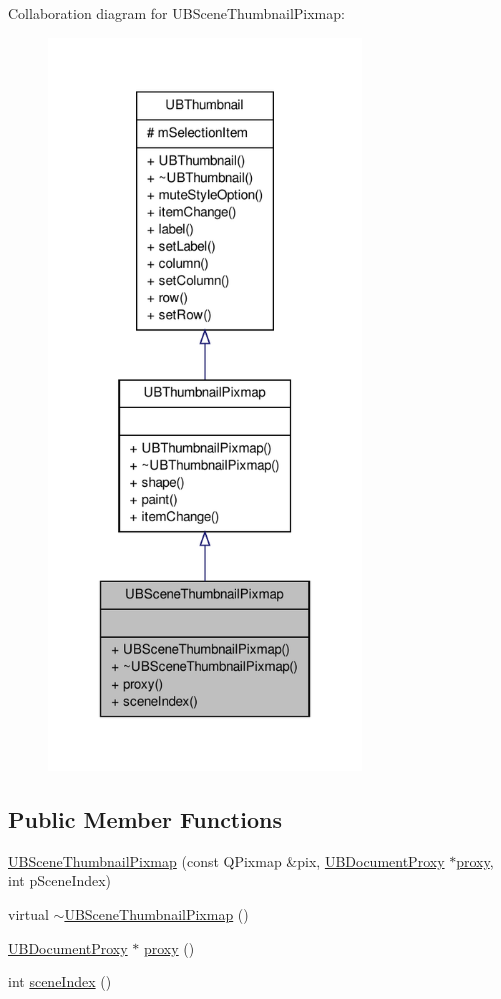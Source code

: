 Collaboration diagram for U\-B\-Scene\-Thumbnail\-Pixmap\-:
\nopagebreak
\begin{figure}[H]
\begin{center}
\leavevmode
\includegraphics[height=550pt]{da/da2/class_u_b_scene_thumbnail_pixmap__coll__graph}
\end{center}
\end{figure}
\subsection*{Public Member Functions}
\begin{DoxyCompactItemize}
\item 
\hyperlink{class_u_b_scene_thumbnail_pixmap_ad38f35c75626fb14f6bf91325836358c}{U\-B\-Scene\-Thumbnail\-Pixmap} (const Q\-Pixmap \&pix, \hyperlink{class_u_b_document_proxy}{U\-B\-Document\-Proxy} $\ast$\hyperlink{class_u_b_scene_thumbnail_pixmap_ae7da44d7a27c5ed55eb753200fcd8d2e}{proxy}, int p\-Scene\-Index)
\item 
virtual \hyperlink{class_u_b_scene_thumbnail_pixmap_ad335e85e48f77cb683f296c6f3287958}{$\sim$\-U\-B\-Scene\-Thumbnail\-Pixmap} ()
\item 
\hyperlink{class_u_b_document_proxy}{U\-B\-Document\-Proxy} $\ast$ \hyperlink{class_u_b_scene_thumbnail_pixmap_ae7da44d7a27c5ed55eb753200fcd8d2e}{proxy} ()
\item 
int \hyperlink{class_u_b_scene_thumbnail_pixmap_a9bc67f587cd73ff2119dd6aa06a07871}{scene\-Index} ()
\end{DoxyCompactItemize}
